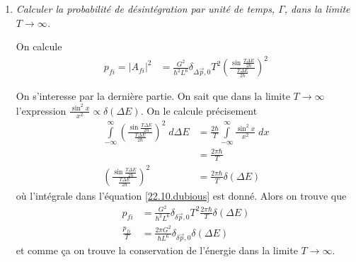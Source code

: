 \documentclass[10pt]{report}
\newcommand{\abs}[1]{\left|#1\right|}
\begin{document}
\begin{enumerate}[1.]
        Ce $\delta$ de Kronecker montre que l'impulsion est conserv\'ee, car $\Delta \vec{n} = 0$ dans toutes d\'esint\'egration. On continue
        \begin{align}
            A_{fi} &= -\frac{iG}{\hbar L^3}\delta_{\Delta \vec{n},0}T\frac{\sin \frac{T\Delta E}{2\hbar}}{\frac{T\Delta E}{2\hbar}}
        \end{align}

        La derni\`ere terme est un function sinc, avec une taille $\sim \frac{\hbar}{T}$. On voit donc que l'\'energie n'est pas n\'ecessairement conserv\'ee sauf si $T \to \infty$. C'est la principe d'incertitude d'Heisenberg.

    \item \emph{Calculer la probabilit\'e de d\'esint\'egration par unit\'e de temps, $\Gamma$, dans la limite $T \to \infty$.}

        On calcule
        \begin{align}
            p_{fi} = \abs{A_{fi}}^2 &= \frac{G^2}{\hbar^2 L^6}\delta_{\Delta \vec{p},0} T^2 \left( \frac{\sin \frac{T \Delta E}{2\hbar}}{\frac{T\Delta E}{2\hbar}} \right)^2
        \end{align}

        On s'interesse par la derni\`ere partie. On sait que dans la limite $T \to \infty$ l'expression $\frac{\sin^2 x}{x^2} \propto \delta\left( \Delta E \right)$. On le calcule pr\'ecisement
        \begin{align}
            \int\limits_{-\infty}^{\infty}\left( \frac{\sin \frac{T \Delta E}{2\hbar}}{\frac{T\Delta E}{2\hbar}} \right)^2\;d \Delta E &= \frac{2\hbar}{T} \int\limits_{-\infty}^{\infty}\frac{\sin^2 x}{x^2}\;dx\\
            &= \frac{2\pi \hbar}{T}\label{22.10.dubious}\\
            \left( \frac{\sin \frac{T \Delta E}{2\hbar}}{\frac{T\Delta E}{2\hbar}} \right)^2 &= \frac{2\pi \hbar}{T}\delta(\Delta E)
        \end{align}
        o\`u l'int\'egrale dans l'\'equation \eqref{22.10.dubious} est donn\'e. Alors on trouve que
        \begin{align}
            p_{fi} &= \frac{G^2}{\hbar^2L^6}\delta_{\delta \vec{p},0} T^2 \frac{2\pi \hbar}{T}\delta\left( \Delta E \right)\\
            \frac{p_{fi}}{T} &= \frac{2\pi G^2}{\hbar L^6}\delta_{\delta \vec{p},0}\delta\left( \Delta E \right)
        \end{align}
        et comme \c{c}a on trouve la conservation de l'\'energie dans la limite $T \to \infty$. 


\end{enumerate}
\end{document}
